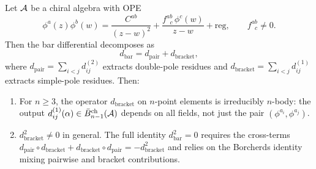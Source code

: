 \begin{proposition}
\label{prop:nonabelian-kernel-nonfactorization}
Let\/ $\mathcal{A}$ be a chiral algebra with OPE
\[
\phi^a(z)\phi^b(w)
= \frac{C^{ab}}{(z-w)^2}
  + \frac{f^{ab}_{\;\;c}\, \phi^c(w)}{z-w}
  + \mathrm{reg},
\qquad f^{ab}_{\;\;c} \neq 0.
\]
Then the bar differential decomposes as
\begin{equation}\label{eq:bar-diff-pair-bracket}
d_{\mathrm{bar}} = d_{\mathrm{pair}} + d_{\mathrm{bracket}},
\end{equation}
where $d_{\mathrm{pair}} = \sum_{i<j} d_{ij}^{(2)}$ extracts
double-pole residues and
$d_{\mathrm{bracket}} = \sum_{i<j} d_{ij}^{(1)}$ extracts
simple-pole residues.  Then:
\begin{enumerate}[label=\textup{(\roman*)}]
\item For $n \geq 3$, the operator $d_{\mathrm{bracket}}$ on
  $n$-point elements is irreducibly $n$-body: the output
  $d_{ij}^{(1)}(\alpha) \in \bar{B}^{\mathrm{ch}}_{n-1}(\mathcal{A})$
  depends on all fields, not just the pair
  $(\phi^{a_i}, \phi^{a_j})$.
\item $d_{\mathrm{bracket}}^2 \neq 0$ in general.  The full
  identity $d_{\mathrm{bar}}^2 = 0$ requires the cross-terms
  $d_{\mathrm{pair}} \circ d_{\mathrm{bracket}}
  + d_{\mathrm{bracket}} \circ d_{\mathrm{pair}}
  = -d_{\mathrm{bracket}}^2$
  and relies on the Borcherds identity mixing pairwise and
  bracket contributions.
\end{enumerate}
\end{proposition}

